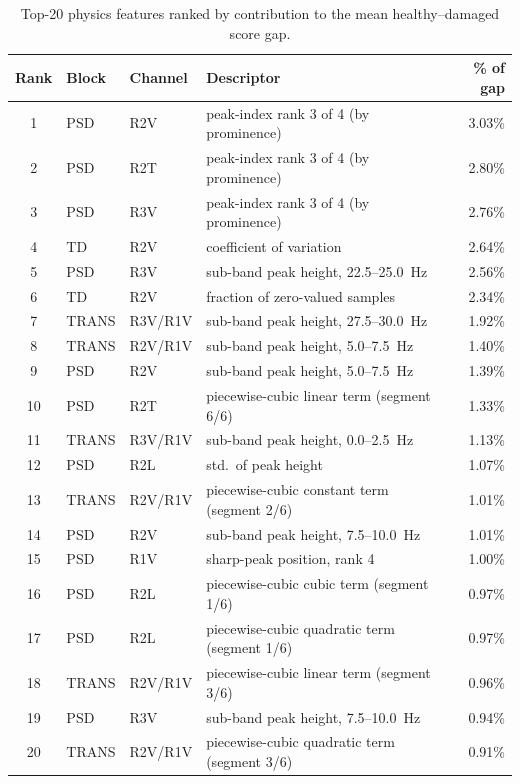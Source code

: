 \documentclass[11pt,a4paper]{article}
\begin{document}
\begin{table}[htbp]
\centering
\caption{Top-20 physics features ranked by contribution to the mean healthy--damaged score gap.}
\label{tab:top20}
\small
\begin{tabular}{@{}clllr@{}}
\toprule
\textbf{Rank} & \textbf{Block} & \textbf{Channel} & \textbf{Descriptor} & \textbf{\% of gap} \\
\midrule
1  & PSD   & R2V     & peak-index rank 3 of 4 (by prominence)      & 3.03\% \\
2  & PSD   & R2T     & peak-index rank 3 of 4 (by prominence)      & 2.80\% \\
3  & PSD   & R3V     & peak-index rank 3 of 4 (by prominence)      & 2.76\% \\
4  & TD    & R2V     & coefficient of variation                    & 2.64\% \\
5  & PSD   & R3V     & sub-band peak height, 22.5--25.0~Hz          & 2.56\% \\
6  & TD    & R2V     & fraction of zero-valued samples              & 2.34\% \\
7  & TRANS & R3V/R1V & sub-band peak height, 27.5--30.0~Hz          & 1.92\% \\
8  & TRANS & R2V/R1V & sub-band peak height, 5.0--7.5~Hz            & 1.40\% \\
9  & PSD   & R2V     & sub-band peak height, 5.0--7.5~Hz            & 1.39\% \\
10 & PSD   & R2T     & piecewise-cubic linear term (segment 6/6)    & 1.33\% \\
11 & TRANS & R3V/R1V & sub-band peak height, 0.0--2.5~Hz            & 1.13\% \\
12 & PSD   & R2L     & std.\ of peak height                        & 1.07\% \\
13 & TRANS & R2V/R1V & piecewise-cubic constant term (segment 2/6)  & 1.01\% \\
14 & PSD   & R2V     & sub-band peak height, 7.5--10.0~Hz           & 1.01\% \\
15 & PSD   & R1V     & sharp-peak position, rank 4                  & 1.00\% \\
16 & PSD   & R2L     & piecewise-cubic cubic term (segment 1/6)     & 0.97\% \\
17 & PSD   & R2L     & piecewise-cubic quadratic term (segment 1/6) & 0.97\% \\
18 & TRANS & R2V/R1V & piecewise-cubic linear term (segment 3/6)    & 0.96\% \\
19 & PSD   & R3V     & sub-band peak height, 7.5--10.0~Hz           & 0.94\% \\
20 & TRANS & R2V/R1V & piecewise-cubic quadratic term (segment 3/6) & 0.91\% \\
\bottomrule
\end{tabular}
\end{table}
\end{document}
